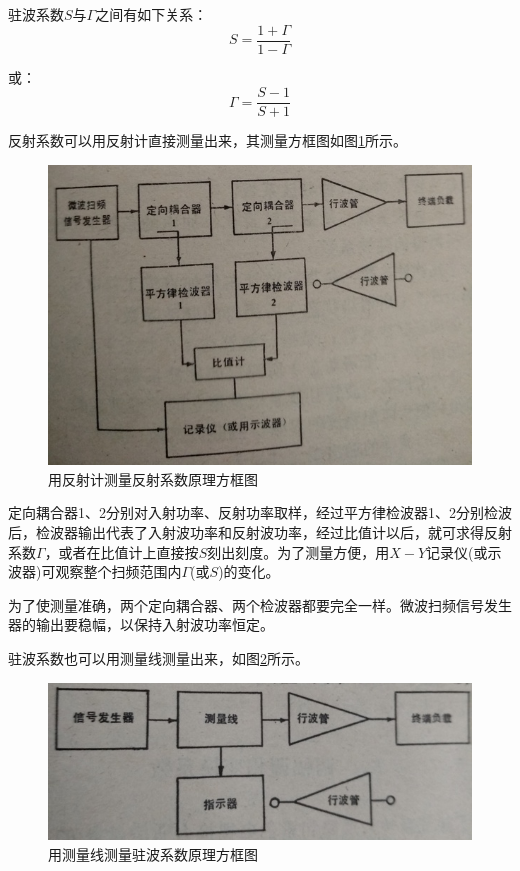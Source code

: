 驻波系数$ S $与$ \varGamma $之间有如下关系：
\begin{equation} \label{eq:11-12}
S = \frac{1 + \varGamma}{1-\varGamma}
\end{equation}


或：
\begin{equation} \label{eq:11-13}
	\varGamma = \frac{S-1}{S+1}
\end{equation}

反射系数可以用反射计直接测量出来，其测量方框图如图\ref{ch11-11}所示。

\begin{figure}[phtb]
	\centering
	\includegraphics[width=0.6\linewidth]{figure/ch11-11}
	\caption{用反射计测量反射系数原理方框图}
	\label{ch11-11}
\end{figure}

定向耦合器1、2分别对入射功率、反射功率取样，经过平方律检波器1、2分别检波后，检波器输出代表了入射波功率和反射波功率，经过比值计以后，就可求得反射系数$ \varGamma $，或者在比值计上直接按$ S $刻出刻度。为了测量方便，用$ X-Y $记录仪(或示波器)可观察整个扫频范围内$ \varGamma $(或$ S $)的变化。

为了使测量准确，两个定向耦合器、两个检波器都要完全一样。微波扫频信号发生器的输出要稳幅，以保持入射波功率恒定。


驻波系数也可以用测量线测量出来，如图\ref{ch11-12}所示。

\begin{figure}[phtb]
	\centering
	\includegraphics[width=0.6\linewidth]{figure/ch11-12}
	\caption{用测量线测量驻波系数原理方框图}
	\label{ch11-12}
\end{figure}

